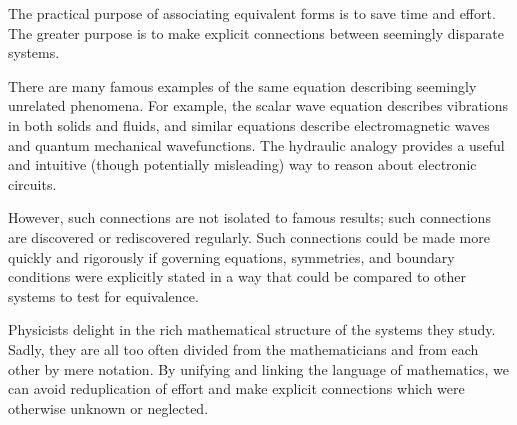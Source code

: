 \documentclass[12pt,letterpaper]{article}
\begin{document}
The practical purpose of associating equivalent forms is to save time and effort.
The greater purpose is to make explicit connections between seemingly disparate systems.

There are many famous examples of the same equation describing seemingly unrelated phenomena.
For example,
the scalar wave equation describes vibrations in both solids and fluids,
and similar equations describe electromagnetic waves and quantum mechanical wavefunctions.
The hydraulic analogy provides a useful and intuitive
(though potentially misleading)
way to reason about electronic circuits.

However,
such connections are not isolated to famous results;
such connections are discovered or rediscovered regularly.
Such connections could be made more quickly and rigorously if governing equations,
symmetries, and boundary conditions were explicitly stated in a way that could be compared to other systems to test for equivalence.

Physicists delight in the rich mathematical structure of the systems they study.
Sadly, they are all too often divided from the mathematicians and from each other by mere notation.
By unifying and linking the language of mathematics,
we can avoid reduplication of effort and make explicit connections which were otherwise unknown or neglected.
\end{document}
